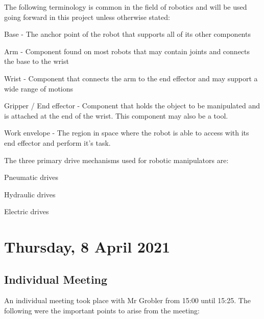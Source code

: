 The following terminology is common in the field of robotics and will be used going forward in this project unless otherwise stated:

\begin{compactitem}
    \item Base - The anchor point of the robot that supports all of its other components
    \item Arm - Component found on most robots that may contain joints and connects the base to the wrist
    \item Wrist - Component that connects the arm to the end effector and may support a wide range of motions
    \item Gripper / End effector - Component that holds the object to be manipulated and is attached at the end of the wrist. This component may also be a tool.
    \item Work envelope - The region in space where the robot is able to access with its end effector and perform it's task.
\end{compactitem}

The three primary drive mechanisms used for robotic manipulators are:

\begin{compactitem}
    \item Pneumatic drives
    \item Hydraulic drives
    \item Electric drives
\end{compactitem}

\pendsign

\section[2021/04/08]{Thursday, 8 April 2021}

\subsection{Individual Meeting}

An individual meeting took place with Mr Grobler from 15:00 until 15:25. The following were the important points to arise from the meeting:

